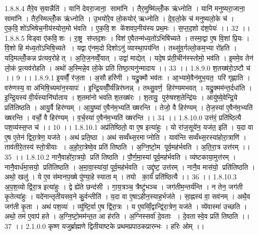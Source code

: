 1.8.8.4
तैरे॒व स॒वान्नैति॑ । यानि॑ देवरा॒जाना॒॒ सामा॑नि । तैर॒मुष्मि॑ल्लोँ॒क ऋ॑ध्नोति । यानि॑ मनुष्यरा॒जाना॒॒ सामा॑नि । तैर॒स्मिल्लोँ॒क ऋ॑ध्नोति । उ॒भयो॑रे॒व लो॒कयोर्॑ ऋध्नोति । दे॒व॒लो॒के च॑ मनुष्यलो॒के च॑ । ए॒क॒वि॒॒शो॑ऽभिषेच॒नीय॑स्योत्त॒मो भ॑वति । ए॒क॒वि॒॒श के॑शवप॒नीय॑स्य प्रथ॒मः । स॒प्त॒द॒शो द॑श॒पेयः॑ ।। 32 ।।
1.8.8.5
विड्वा ए॑कवि॒॒शः । रा॒ष्ट्र स॑प्तद॒शः । विश॑ ए॒वैतन्म॑ध्य॒तो॑ऽभिषि॑च्यते । तस्मा॒द्वा ए॒ष वि॒शां प्रि॒यः । वि॒शो हि म॑ध्य॒तो॑ऽभिषि॒च्यते । यद्वा ए॑नम॒दो दिशोऽनु॑ व्यास्था॒पय॑न्ति । तथ्सु॑व॒र्गल्लो॒कम॒भ्या रो॑हति । यदि॒मल्लोँ॒कन्न प्र॑त्यव॒रोहेत् । अ॒ति॒ज॒नव्वेँ॒यात् । उद्वा॑ माद्येत् । यदे॒ष प्र॑ती॒चीन॑स्स्तोमो॒ भव॑ति । इ॒ममे॒व तेन॑ लो॒कं प्र॒त्यव॑रोहति । अथो॑ अ॒स्मिन्ने॒व लो॒के प्रति॑ तिष्ठ॒त्यनु॑न्मादाय ।। 33 ।।
1.8.9.0
श॒तख्ष॑रो॒ऽष्टौ च॑ ।। 9 ।।
1.8.9.1
इ॒यव्वैँ॒ र॑ज॒ता । अ॒सौ हरि॑णी । यद्रु॒क्मौ भव॑तः । आ॒भ्यामे॒वैन॑मुभ॒यत॒ परि॑ गृह्णाति । वरु॑णस्य॒ वा अ॑भिषि॒च्यमा॑न॒स्यापः॑ । इ॒न्द्रि॒यव्वीँ॒र्य॑न्निर॑घ्नन्न् । तथ्सु॒वर्ण॒॒ हिर॑ण्यमभवत् । यद्रु॒क्मम॑न्त॒र्दधा॑ति । इ॒न्द्रि॒यस्य॑ वी॒र्य॑स्यानि॑र्घाताय । श॒तमा॑नो भवति श॒तख्ष॑रः । श॒तायु॒ पुरु॑षश्श॒तेन्द्रि॑यः । आयु॑ष्ये॒वेन्द्रि॒ये प्रति॑तिष्ठति । आयु॒र्वै हिर॑ण्यम् । आ॒यु॒ष्या॑ ए॒वैन॑म॒भ्यति॑ ख्षरन्ति । तेजो॒ वै हिर॑ण्यम् । ते॒ज॒स्या॑ ए॒वैन॑म॒भ्यति॑ ख्षरन्ति । वर्चो॒ वै हिर॑ण्यम् । व॒र्च॒स्या॑ ए॒वैन॑म॒भ्यति॑ ख्षरन्ति ।। 34 ।।
1.8.10.0
उत्त॑रं॒ प्रति॑ष्ठित्यै पश॒व्य॑स्स॒प्त च॑ ।। 10 ।।
1.8.10.1
अप्र॑तिष्ठितो॒ वा ए॒ष इत्या॑हुः । यो रा॑ज॒सूये॑न॒ यज॑त॒ इति॑ । य॒दा वा ए॒ष ए॒तेन॑ द्विरा॒त्रेण॒ यज॑ते । अथ॑ प्रति॒ष्ठा । अथ॑ सव्वँथ्स॒रमाप्नोति । याव॑न्ति सव्वँथ्स॒रस्या॑होरा॒त्राणि॑ । ताव॑तीरे॒तस्य॑ स्तो॒त्रीयाः । अ॒हो॒रा॒त्रेष्वे॒व प्रति॑ तिष्ठति । अ॒ग्नि॒ष्टो॒म पूर्व॒मह॑र्भवति । अ॒ति॒रा॒त्र उत्त॑रम् ।। 35 ।।
1.8.10.2
नानै॒वाहो॑रा॒त्रयो॒ प्रति॑ तिष्ठति । पौ॒र्ण॒मा॒स्यां पूर्व॒मह॑र्भवति । व्य॑ष्टकाया॒मुत्त॑रम् । नानै॒वार्ध॑मा॒सयो॒ प्रति॑तिष्ठति । अ॒मा॒वा॒स्या॑यां॒ पूर्व॒मह॑र्भवति । उद्दृ॑ष्ट॒ उत्त॑रम् । नानै॒व मास॑यो॒ प्रति॑तिष्ठति । अथो॒ खलु॑ । ये ए॒व स॑मानप॒ख्षे पु॑ण्या॒हे स्याताम् । तयो का॒र्यं॑ प्रति॑ष्ठित्यै ।। 36 ।।
1.8.10.3
अ॒प॒श॒व्यो द्वि॑रा॒त्र इत्या॑हुः । द्वे ह्ये॑ते छन्द॑सी । गा॒य॒त्रञ्च॒ त्रैष्टु॑भञ्च । जग॑तीम॒न्तर्य॑न्ति । न तेन॒ जग॑ती कृ॒तेत्या॑हुः । यदे॑नान्तृतीयसव॒ने कु॒र्वन्तीति॑ । य॒दा वा ए॒षाऽहीन॒स्याह॒र्भज॑ते । सा॒ह्नस्य॑ वा॒ सव॑नम् । अथै॒व जग॑ती कृ॒ता । अथ॑ पश॒व्यः॑ । व्यु॑ष्टि॒र्वा ए॒ष द्वि॑रा॒त्रः । य ए॒वव्विँ॒द्वान्द्वि॑रा॒त्रेण॒ यज॑ते । व्ये॑वास्मा॑ उच्छति । अथो॒ तम॑ ए॒वाप॑ हते । अ॒ग्नि॒ष्टो॒मम॑न्त॒त आ ह॑रति । अ॒ग्निस्सर्वा॑ दे॒वताः । दे॒वतास्वे॒व प्रति॑ तिष्ठति ।। 37 ।।
2.1.0.0
कृष्ण यजुर्ब्राह्मणे द्वितीयाष्टके प्रथमप्रपाठकप्रारम्भः । हरिः ओम् ।।
